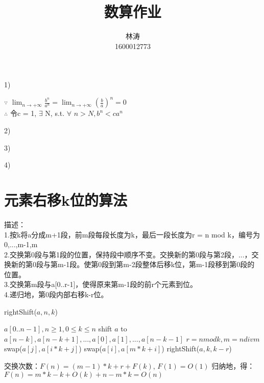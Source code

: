 \documentclass[UTF8]{ctexart}
\title{数算作业}
\author{林涛\\1600012773}
\begin{document}
\maketitle
\section{} %


\section{}%
1)

$\because$ ${\lim_{n\to +\infty}}\frac{b^n}{a^n}={\lim_{n\to +\infty}}(\frac{b}{a})^{n}=0$\\
$\therefore$ 令c = 1, $\exists$ N, s.t. $\forall$ $n>N, b^n<ca^n$




2)

3)

4)

\section{元素右移k位的算法}%
描述：\\
1.按k将a分成m+1段，前m段每段长度为k，最后一段长度为r = n mod k，编号为0,...,m-1,m\\
2.交换第0段与第1段的位置，保持段中顺序不变。交换新的第0段与第2段，...，交换新的第0段与第m-1段。使第0段到第m-2段整体后移k位，第m-1段移到第0段的位置。\\
3.交换第m段与a[0..r-1]，使得原来第m-1段的前r个元素到位。\\
4.递归地，第0段内部右移k-r位。\\

\begin{algorithm}
\caption{rightShift($a,n,k$)}
\begin{algorithmic}
\REQUIRE $a[0..n-1], n \geq 1,0\leq k \leq n$
\ENSURE shift $a$ to $a[n-k], a[n-k+1], ..., a[0], a[1], ..., a[n-k-1]$
 \RETURN
\ENDIF
\STATE $r=n  mod  k, m = n  div  m$
		\STATE swap($a[j], a[i*k+j]$)
	\ENDFOR
\ENDFOR
{} \RETURN
\ENDIF
{}
	\STATE swap($a[i], a[m*k+i]$)
\ENDFOR	
\STATE rightShift($a,k,k-r$)
\RETURN
\end{algorithmic}
\end{algorithm}
交换次数：$F(n) = (m-1)*k + r + F(k)$, $F(1) = O(1)$
归纳地，得：$F(n) = m*k - k +O(k) + n - m*k = O(n)$
\end{document}
